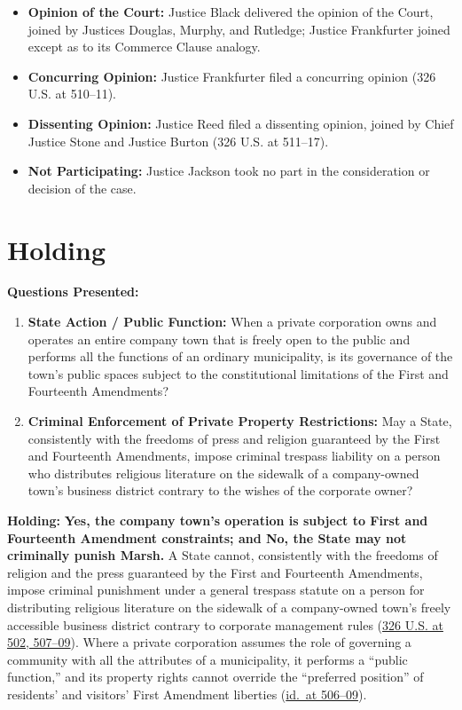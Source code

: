 \documentclass[12pt]{article}
\begin{document}
\begin{itemize}
    \item \textbf{Opinion of the Court:} Justice Black delivered the opinion of the Court, joined by Justices Douglas, Murphy, and Rutledge; Justice Frankfurter joined except as to its Commerce Clause analogy.
    \item \textbf{Concurring Opinion:} Justice Frankfurter filed a concurring opinion (326 U.S. at 510--11).
    \item \textbf{Dissenting Opinion:} Justice Reed filed a dissenting opinion, joined by Chief Justice Stone and Justice Burton (326 U.S. at 511--17).
    \item \textbf{Not Participating:} Justice Jackson took no part in the consideration or decision of the case.
\end{itemize}

\section{Holding}
\textbf{Questions Presented:}

\begin{enumerate}
  \item \textbf{State Action / Public Function:} When a private corporation owns and operates an entire company town that is freely open to the public and performs all the functions of an ordinary municipality, is its governance of the town's public spaces subject to the constitutional limitations of the First and Fourteenth Amendments?
  \item \textbf{Criminal Enforcement of Private Property Restrictions:} May a State, consistently with the freedoms of press and religion guaranteed by the First and Fourteenth Amendments, impose criminal trespass liability on a person who distributes religious literature on the sidewalk of a company-owned town's business district contrary to the wishes of the corporate owner?
\end{enumerate}

\textbf{Holding:} \textbf{Yes, the company town's operation is subject to First and Fourteenth Amendment constraints; and No, the State may not criminally punish Marsh.} A State cannot, consistently with the freedoms of religion and the press guaranteed by the First and Fourteenth Amendments, impose criminal punishment under a general trespass statute on a person for distributing religious literature on the sidewalk of a company-owned town's freely accessible business district contrary to corporate management rules (\href{https://supreme.justia.com/cases/federal/us/326/501/}{326 U.S. at 502, 507--09}). Where a private corporation assumes the role of governing a community with all the attributes of a municipality, it performs a ``public function,'' and its property rights cannot override the ``preferred position'' of residents' and visitors' First Amendment liberties (\href{https://supreme.justia.com/cases/federal/us/326/501/}{id.\ at 506--09}).
\end{document}
